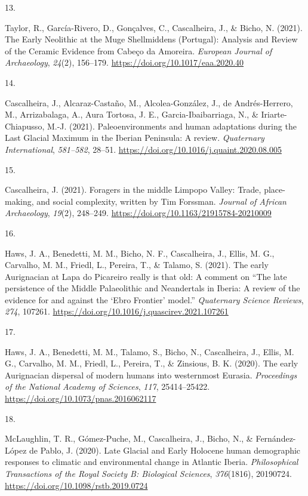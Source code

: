 \documentclass[11pt,a4paper,]{awesome-cv}
\newlength{\cslhangindent}
\newlength{\csllabelwidth}
\newenvironment{CSLReferences}[2] %
 {\begin{list}{}{%
  \setlength{\itemindent}{0pt}
  \setlength{\leftmargin}{0pt}
  \setlength{\parsep}{0pt}
  \ifodd #1
   \setlength{\leftmargin}{\cslhangindent}
   \setlength{\itemindent}{-1\cslhangindent}
  \fi
  \setlength{\itemsep}{#2\baselineskip}}}
 {\end{list}}
\newcommand{\CSLLeftMargin}[1]{\parbox[t]{\csllabelwidth}{\strut#1\strut}}
\newcommand{\CSLRightInline}[1]{\parbox[t]{\linewidth - \csllabelwidth}{\strut#1\strut}}
\begin{document}
\begin{CSLReferences}{0}{0}
\CSLLeftMargin{13. }%
\CSLRightInline{Taylor, R., García-Rivero, D., Gonçalves, C.,
Cascalheira, J., \& Bicho, N. (2021). The Early Neolithic at the Muge
Shellmiddens (Portugal): Analysis and Review of the Ceramic Evidence
from Cabeço da Amoreira. \emph{European Journal of Archaeology},
\emph{24}(2), 156--179. \url{https://doi.org/10.1017/eaa.2020.40}}

\CSLLeftMargin{14. }%
\CSLRightInline{Cascalheira, J., Alcaraz-Castaño, M., Alcolea-González,
J., de Andrés-Herrero, M., Arrizabalaga, A., Aura Tortosa, J. E.,
Garcia-Ibaibarriaga, N., \& Iriarte-Chiapusso, M.-J. (2021).
Paleoenvironments and human adaptations during the Last Glacial Maximum
in the Iberian Peninsula: A review. \emph{Quaternary International},
\emph{581--582}, 28--51.
\url{https://doi.org/10.1016/j.quaint.2020.08.005}}

\CSLLeftMargin{15. }%
\CSLRightInline{Cascalheira, J. (2021). Foragers in the middle Limpopo
Valley: Trade, place-making, and social complexity, written by Tim
Forssman. \emph{Journal of African Archaeology}, \emph{19}(2), 248--249.
\url{https://doi.org/10.1163/21915784-20210009}}

\CSLLeftMargin{16. }%
\CSLRightInline{Haws, J. A., Benedetti, M. M., Bicho, N. F.,
Cascalheira, J., Ellis, M. G., Carvalho, M. M., Friedl, L., Pereira, T.,
\& Talamo, S. (2021). The early Aurignacian at Lapa do Picareiro really
is that old: A comment on {``The late persistence of the Middle
Palaeolithic and Neandertals in Iberia: A review of the evidence for and
against the {`Ebro Frontier'} model.''} \emph{Quaternary Science
Reviews}, \emph{274}, 107261.
\url{https://doi.org/10.1016/j.quascirev.2021.107261}}

\CSLLeftMargin{17. }%
\CSLRightInline{Haws, J. A., Benedetti, M. M., Talamo, S., Bicho, N.,
Cascalheira, J., Ellis, M. G., Carvalho, M. M., Friedl, L., Pereira, T.,
\& Zinsious, B. K. (2020). The early Aurignacian dispersal of modern
humans into westernmost Eurasia. \emph{Proceedings of the National
Academy of Sciences}, \emph{117}, 25414--25422.
\url{https://doi.org/10.1073/pnas.2016062117}}

\CSLLeftMargin{18. }%
\CSLRightInline{McLaughlin, T. R., Gómez-Puche, M., Cascalheira, J.,
Bicho, N., \& Fernández-López de Pablo, J. (2020). Late Glacial and
Early Holocene human demographic responses to climatic and environmental
change in Atlantic Iberia. \emph{Philosophical Transactions of the Royal
Society B: Biological Sciences}, \emph{376}(1816), 20190724.
\url{https://doi.org/10.1098/rstb.2019.0724}}


\end{CSLReferences}
\end{document}
